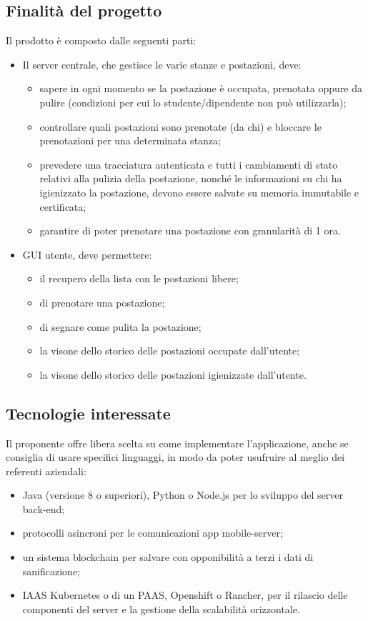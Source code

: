 \subsection{Finalità del progetto}
Il prodotto è composto dalle seguenti parti:
\begin{itemize}
\item Il server centrale, che gestisce le varie stanze e postazioni, deve:
\begin{itemize}
\item sapere in ogni momento se la postazione è occupata, prenotata oppure da pulire (condizioni per cui
lo studente/dipendente non può utilizzarla);
\item controllare quali postazioni sono prenotate (da chi) e bloccare le prenotazioni per una determinata stanza;
\item prevedere una tracciatura autenticata e tutti i cambiamenti di stato relativi alla pulizia della
postazione, nonché le informazioni su chi ha igienizzato la postazione, devono essere salvate su
memoria immutabile e certificata;
\item garantire di poter prenotare una postazione con granularità di 1 ora.
\end{itemize}
\item GUI utente, deve permettere:
\begin{itemize}
\item il recupero della lista con le postazioni libere;
\item di prenotare una postazione;
\item di segnare come pulita la postazione;
\item la visone dello storico delle postazioni occupate dall'utente;
\item la visone dello storico delle postazioni igienizzate dall'utente.
\end{itemize}
\end{itemize}

\subsection{Tecnologie interessate}
Il proponente offre libera scelta su come implementare l'applicazione, anche se consiglia di usare specifici linguaggi, in modo da poter usufruire al meglio dei referenti aziendali:
\begin{itemize}
\item Java (versione 8 o superiori), Python o Node.js per lo sviluppo del server back-end;
\item protocolli asincroni per le comunicazioni app mobile-server;
\item un sistema blockchain per salvare con opponibilità a terzi i dati di sanificazione;
\item IAAS Kubernetes o di un PAAS, Openshift o Rancher, per il rilascio delle componenti del server e la
gestione della scalabilità orizzontale.
\end{itemize}

